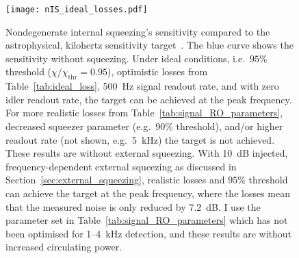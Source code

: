 \begin{figure}
    \centering
    \texttt{[image: nIS\_ideal\_losses.pdf]}
    \caption{  Nondegenerate internal squeezing's sensitivity compared to the astrophysical, kilohertz sensitivity target~\cite{miaoDesignGravitationalWaveDetectors2018}. The blue curve shows the sensitivity without squeezing. Under ideal conditions, i.e.\ $95\%$ threshold ($\chi/\chi_\text{thr}=0.95$), optimistic losses from Table~\ref{tab:ideal_loss}, 500~Hz signal readout rate, and with zero idler readout rate, the target can be achieved at the peak frequency. For more realistic losses from Table~\ref{tab:signal_RO_parameters}, decreased squeezer parameter (e.g.\ $90\%$ threshold), and/or higher readout rate (not shown, e.g.\ 5~kHz) the target is not achieved. These results are without external squeezing. With 10~dB injected, frequency-dependent external squeezing as discussed in Section~\ref{sec:external_squeezing}, realistic losses and $95\%$ threshold can achieve the target at the peak frequency, where the losses mean that the measured noise is only reduced by $7.2$~dB.
    I use the parameter set in Table~\ref{tab:signal_RO_parameters} which has not been optimised for 1--4~kHz detection, and these results are without increased circulating power.}
    \label{fig:nIS_sens_target}
\end{figure}

